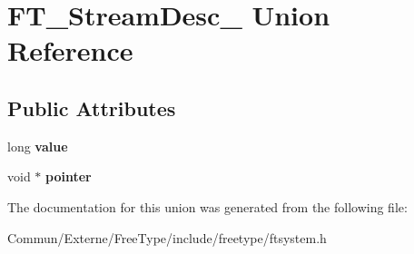 \hypertarget{union_f_t___stream_desc__}{}\section{F\+T\+\_\+\+Stream\+Desc\+\_\+ Union Reference}
\label{union_f_t___stream_desc__}
\subsection*{Public Attributes}
\begin{DoxyCompactItemize}
\item 
long {\bfseries value}\hypertarget{union_f_t___stream_desc___a1a94493032faef1c3ed7bc33816ce90c}{}\label{union_f_t___stream_desc___a1a94493032faef1c3ed7bc33816ce90c}

\item 
void $\ast$ {\bfseries pointer}\hypertarget{union_f_t___stream_desc___a410ed102dc377fb9a5b9c950c3f863dc}{}\label{union_f_t___stream_desc___a410ed102dc377fb9a5b9c950c3f863dc}

\end{DoxyCompactItemize}


The documentation for this union was generated from the following file\+:\begin{DoxyCompactItemize}
\item 
Commun/\+Externe/\+Free\+Type/include/freetype/ftsystem.\+h\end{DoxyCompactItemize}
